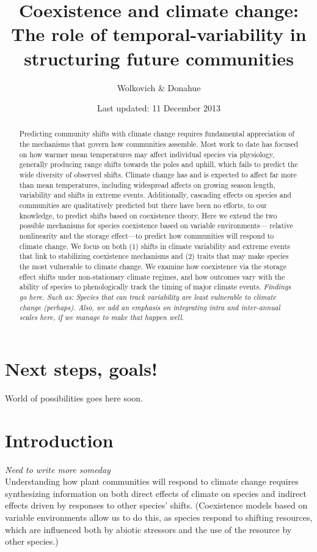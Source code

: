 \documentclass[11pt,a4paper,oneside]{article}
\begin{document}
\renewcommand{\labelitemi}{$-$}
\title{Coexistence and climate change: \\The role of
    temporal-variability in structuring future communities}
    \author{Wolkovich \& Donahue}
\date{Last updated: 11 December 2013}
\maketitle

\begin{abstract} Predicting community shifts
with climate change requires fundamental appreciation of the
mechanisms that govern how communities assemble. Most work to date has
focused on how warmer mean temperatures may affect individual species
via physiology, generally producing range shifts towards the poles and
uphill, which fails to predict the wide diversity of observed shifts.
Climate change has and is expected to affect far more than mean
temperatures, including widespread affects on growing season
length, variability and shifts in extreme events. Additionally,
cascading effects on species and communities are qualitatively
predicted but there have been no efforts, to our knowledge, to predict
shifts based on coexistence theory. Here we extend the two possible
mechanisms for species coexistence based on variable environments---
relative nonlinearity and the storage effect---to predict how
communities will respond to climate change. We focus on both (1) shifts in
climate variability and extreme events that link to
stabilizing coexistence mechanisms and (2) traits that may
make species the most vulnerable to climate change. We examine how
coexistence via the storage effect shifts under non-stationary climate regimes, and how outcomes vary with the
ability of species to phenologically track the timing of major climate events. \emph{Findings go here. Such as: Species that can track variability are least vulnerable to climate change (perhaps).  Also, we add an emphasis on integrating intra and inter-annual scales here, if we manage to make that happen well.}
\end{abstract}

\newpage




\section{Next steps, goals!}
\noindent World of possibilities goes here soon.

\section{Introduction}
\noindent \emph{Need to write more someday} \\
\noindent Understanding how plant communities will respond to climate change
requires synthesizing information on both direct effects of climate on species
and indirect effects driven by responses to other species'
shifts. (Coexistence models based on variable environments allow us to
do this, as species respond to shifting resources, which are
influenced both by abiotic stressors and the use of the resource by
other species.)
\end{document}
